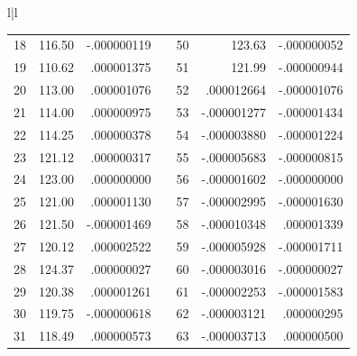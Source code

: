 \begin{table}[H]
{{{\begin{tabular}{l|l}
\begin{tabular}{crrccrr}
            18 &  116.50 & -.000000119 & & 50 &  123.63     & -.000000052 \\
            19 &  110.62 &  .000001375 & & 51 &  121.99     & -.000000944 \\
            20 &  113.00 &  .000001076 & & 52 &  .000012664 & -.000001076 \\
            21 &  114.00 &  .000000975 & & 53 & -.000001277 & -.000001434 \\
            22 &  114.25 &  .000000378 & & 54 & -.000003880 & -.000001224 \\
            23 &  121.12 &  .000000317 & & 55 & -.000005683 & -.000000815 \\
            24 &  123.00 &  .000000000 & & 56 & -.000001602 & -.000000000 \\
            25 &  121.00 &  .000001130 & & 57 & -.000002995 & -.000001630 \\
            26 &  121.50 & -.000001469 & & 58 & -.000010348 &  .000001339 \\
            27 &  120.12 &  .000002522 & & 59 & -.000005928 & -.000001711 \\
            28 &  124.37 &  .000000027 & & 60 & -.000003016 & -.000000027 \\
            29 &  120.38 &  .000001261 & & 61 & -.000002253 & -.000001583 \\
            30 &  119.75 & -.000000618 & & 62 & -.000003121 &  .000000295 \\
            31 &  118.49 &  .000000573 & & 63 & -.000003713 &  .000000500 \\
            \end{tabular}
        \end{tabular}
        }
    } }
    \label{table:08_04}
\end{table}
